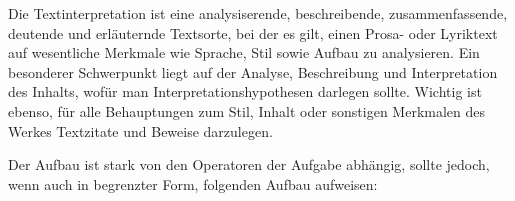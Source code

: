 



\thispagestyle{plain}



Die Textinterpretation ist eine analysiserende, beschreibende, zusammenfassende, deutende und erl\"{a}uternde Textsorte, bei der es gilt, einen Prosa- oder Lyriktext auf wesentliche Merkmale wie Sprache, Stil sowie Aufbau zu analysieren. Ein besonderer Schwerpunkt liegt auf der Analyse, Beschreibung und Interpretation des Inhalts, wof\"{u}r man Interpretationshypothesen darlegen sollte. Wichtig ist ebenso, f\"{u}r alle Behauptungen zum Stil, Inhalt oder sonstigen Merkmalen des Werkes Textzitate und Beweise darzulegen.


Der Aufbau ist stark von den Operatoren der Aufgabe abh\"{a}ngig, sollte jedoch, wenn auch in begrenzter Form, folgenden Aufbau aufweisen:

